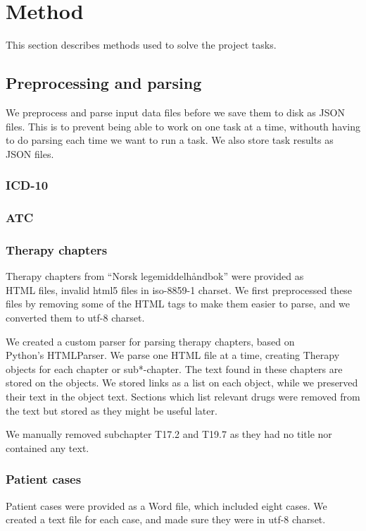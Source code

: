 \chapter{Method}
\label{cha:method}
This section describes methods used to solve the project tasks.


\section{Preprocessing and parsing}
We preprocess and parse input data files before we save them to disk as JSON
files. This is to prevent being able to work on one task at a time, withouth
having to do parsing each time we want to run a task. We also store task
results as JSON files.

\subsection{ICD-10}

\subsection{ATC}

\subsection{Therapy chapters}
Therapy chapters from ``Norsk legemiddelhåndbok'' were provided as\\
HTML files, invalid html5 files in iso-8859-1 charset. We first preprocessed
these files by removing some of the HTML tags to make them easier to parse,
and we converted them to utf-8 charset.

We created a custom parser for parsing therapy chapters, based on\\
Python's HTMLParser. We parse one HTML file at a time, creating Therapy
objects for each chapter or sub*-chapter. The text found in these chapters are
stored on the objects. We stored links as a list on each object, while we
preserved their text in the object text. Sections which list relevant drugs
were removed from the text but stored as they might be useful later.

We manually removed subchapter T17.2 and T19.7 as they had no title nor
contained any text.

\subsection{Patient cases}
Patient cases were provided as a Word file, which included eight cases. We
created a text file for each case, and made sure they were in utf-8 charset.


